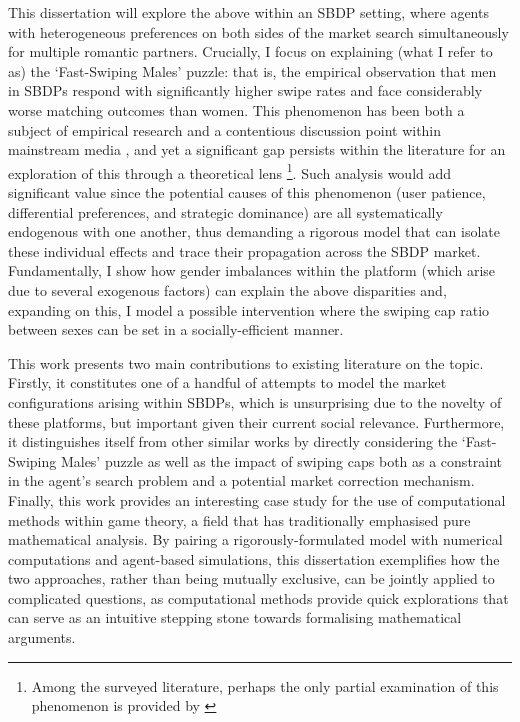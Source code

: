 This dissertation will explore the above within an SBDP setting, where agents with heterogeneous preferences on both sides of the market search simultaneously for multiple romantic partners.
Crucially, I focus on explaining (what I refer to as) the `Fast-Swiping Males' puzzle: that is, the empirical observation that men in SBDPs respond with significantly higher swipe rates and face considerably worse matching outcomes than women. This phenomenon has been both a subject of empirical research \citep{tyson2016first} and a contentious discussion point within mainstream media \citep{web:vice_tindermen, web:wp_miserabletinder}, and yet a significant gap persists within the literature for an exploration of this through a theoretical lens \footnote{Among the surveyed literature, perhaps the only partial examination of this phenomenon is provided by \cite{kanoria2021facilitating}}. 
Such analysis would add significant value since the potential causes of this phenomenon (user patience, differential preferences, and strategic dominance) are all systematically endogenous with one another, thus demanding a rigorous model that can isolate these individual effects and trace their propagation across the SBDP market.
Fundamentally, I show how gender imbalances within the platform (which arise due to several exogenous factors) can explain the above disparities and, expanding on this, I model a possible intervention where the swiping cap ratio between sexes can be set in a socially-efficient manner.

This work presents two main contributions to existing literature on the topic. 
Firstly, it constitutes one of a handful of attempts to model the market configurations arising within SBDPs, which is unsurprising due to the novelty of these platforms, but important given their current social relevance. 
Furthermore, it distinguishes itself from other similar works by directly considering the `Fast-Swiping Males' puzzle as well as the impact of swiping caps both as a constraint in the agent's search problem and a potential market correction mechanism.
Finally, this work provides an interesting case study for the use of computational methods within game theory, a field that has traditionally emphasised pure mathematical analysis.
By pairing a rigorously-formulated model with numerical computations and agent-based simulations, this dissertation exemplifies how the two approaches, rather than being mutually exclusive, can be jointly applied to complicated questions, as computational methods provide quick explorations that can serve as an intuitive stepping stone towards formalising mathematical arguments.

